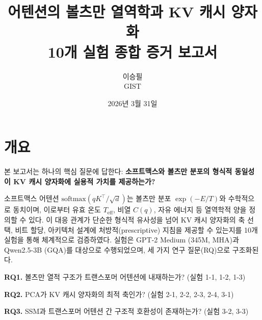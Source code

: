 \documentclass[11pt,a4paper]{article}
\title{\textbf{어텐션의 볼츠만 열역학과 KV 캐시 양자화}\\[0.5em]
\Large 10개 실험 종합 증거 보고서}
\author{이승필\\GIST}
\date{2026년 3월 31일}
\newcommand{\teff}{T_\mathrm{eff}}
\newcommand{\Cq}{C(q)}
\begin{document}
\maketitle

\section{개요}

본 보고서는 하나의 핵심 질문에 답한다: \textbf{소프트맥스와 볼츠만 분포의 형식적 동일성이 KV 캐시 양자화에 실용적 가치를 제공하는가?}

소프트맥스 어텐션 $\mathrm{softmax}(qK^\top / \sqrt{d})$는 볼츠만 분포 $\exp(-E/T)$와 수학적으로 동치이며, 이로부터 유효 온도 $\teff$, 비열 $\Cq$, 자유 에너지 등 열역학적 양을 정의할 수 있다. 이 대응 관계가 단순한 형식적 유사성을 넘어 KV 캐시 양자화의 축 선택, 비트 할당, 아키텍처 설계에 처방적(prescriptive) 지침을 제공할 수 있는지를 10개 실험을 통해 체계적으로 검증하였다. 실험은 GPT-2 Medium (345M, MHA)과 Qwen2.5-3B (GQA)를 대상으로 수행되었으며, 세 가지 연구 질문(RQ)으로 구조화된다.

\textbf{RQ1.} 볼츠만 열적 구조가 트랜스포머 어텐션에 내재하는가? (실험 1-1, 1-2, 1-3)

\textbf{RQ2.} PCA가 KV 캐시 양자화의 최적 축인가? (실험 2-1, 2-2, 2-3, 2-4, 3-1)

\textbf{RQ3.} SSM과 트랜스포머 어텐션 간 구조적 호환성이 존재하는가? (실험 3-2, 3-3)
\end{document}
